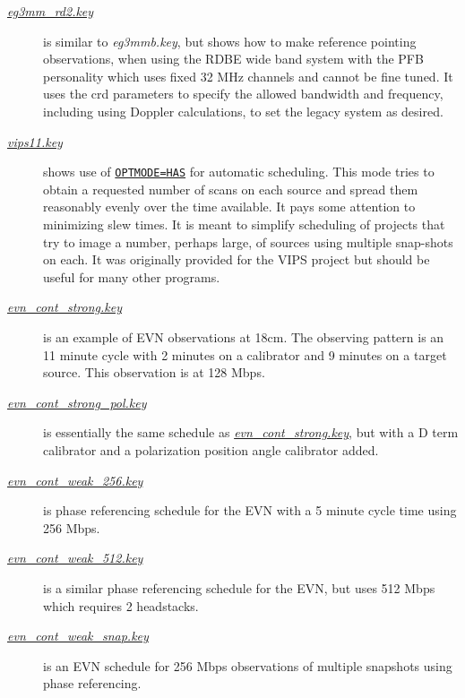 \documentclass{report}
\begin{document}
\begin{description}
\item[
{\href{examples/eg3mm\_rd2.key}{{\sl eg3mm\_rd2.key}}}]
is similar to {\sl eg3mmb.key}, but shows how to make reference
pointing observations, when using the RDBE wide band system with the
PFB personality which uses fixed 32 MHz channels and cannot be fine
tuned.  It uses the crd parameters to specify the allowed bandwidth
and frequency, including using Doppler calculations, to set the legacy
system as desired.


\item[
{\href{examples/vips11.key}{{\sl vips11.key}}}]
shows use of 
{\hyperref[MP:OPTMODE]{{\tt OPTMODE=HAS}}} for automatic
scheduling.  This mode tries to obtain a requested number of scans on
each source and spread them reasonably evenly over the time available.
It pays some attention to minimizing slew times.  It is meant to
simplify scheduling of projects that try to image a number, perhaps
large, of sources using multiple snap-shots on each.  It was
originally provided for the VIPS project but should be useful for many
other programs.

\item[
{\href{examples/evn\_cont\_strong.key}{{\sl evn\_cont\_strong.key}}}]
is an example of EVN observations at
18cm.  The observing pattern is an 11 minute cycle with 2 minutes on
a calibrator and 9 minutes on a target source.  This observation is at
128 Mbps.

\item[
{\href{examples/evn\_cont\_strong\_pol.key}{{\sl evn\_cont\_strong\_pol.key}}}]
is essentially the same schedule as 
{\href{examples/evn\_cont\_strong.key}{{\sl evn\_cont\_strong.key}}},
but with a D
term calibrator and a polarization position angle calibrator added.

\item[
{\href{examples/evn\_cont\_weak\_256.key}{{\sl evn\_cont\_weak\_256.key}}}]
is phase referencing schedule for
the EVN with a 5 minute cycle time using 256 Mbps.

\item[
{\href{examples/evn\_cont\_weak\_512.key}{{\sl evn\_cont\_weak\_512.key}}}]
is a similar phase referencing schedule
for the EVN, but uses 512 Mbps which requires 2 headstacks.

\item[
{\href{examples/evn\_cont\_weak\_snap.key}{{\sl evn\_cont\_weak\_snap.key}}}]
is an EVN schedule for 256 Mbps
observations of multiple snapshots using phase referencing.


\end{description}
\end{document}
